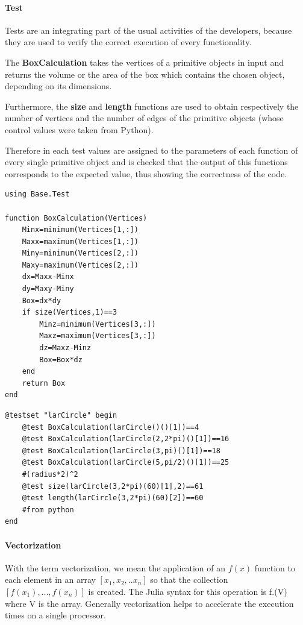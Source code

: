 \documentclass{article}
\begin{document}
\paragraph{Test\\}

Tests are an integrating part of the usual activities of the developers, because they are used to verify the correct execution of every functionality.  

The \textbf{BoxCalculation} takes the vertices of a primitive objects in input and returns the volume or the area of the box which contains the chosen object, depending on its dimensions.

Furthermore, the \textbf{size} and \textbf{length} functions are used to obtain respectively the number of vertices and the number of edges of the primitive objects (whose control values were taken from Python).

Therefore in each test values are assigned to the parameters of each function of every single primitive object and is checked that the output of this functions corresponds to the expected value, thus showing the correctness of the code.

\begin{Verbatim}
using Base.Test

function BoxCalculation(Vertices)
	Minx=minimum(Vertices[1,:])
	Maxx=maximum(Vertices[1,:])
	Miny=minimum(Vertices[2,:])
	Maxy=maximum(Vertices[2,:])
	dx=Maxx-Minx
	dy=Maxy-Miny
	Box=dx*dy
	if size(Vertices,1)==3
		Minz=minimum(Vertices[3,:])
		Maxz=maximum(Vertices[3,:])
		dz=Maxz-Minz
		Box=Box*dz
	end
	return Box
end
\end{Verbatim}

\begin{Verbatim}
@testset "larCircle" begin
	@test BoxCalculation(larCircle()()[1])==4
	@test BoxCalculation(larCircle(2,2*pi)()[1])==16
	@test BoxCalculation(larCircle(3,pi)()[1])==18
	@test BoxCalculation(larCircle(5,pi/2)()[1])==25
	#(radius*2)^2
	@test size(larCircle(3,2*pi)(60)[1],2)==61
	@test length(larCircle(3,2*pi)(60)[2])==60
	#from python
end
\end{Verbatim}

\paragraph{Vectorization\\}

With the term vectorization, we mean the application of an $f(x)$ function to each element in an array $[x_1,x_2,..x_n]$ so that the collection $[f(x_1),...,f(x_n)]$ is created. The Julia syntax for this operation is f.(V) where V is the array. Generally vectorization helps to accelerate the execution times on a single processor.
\end{document}
